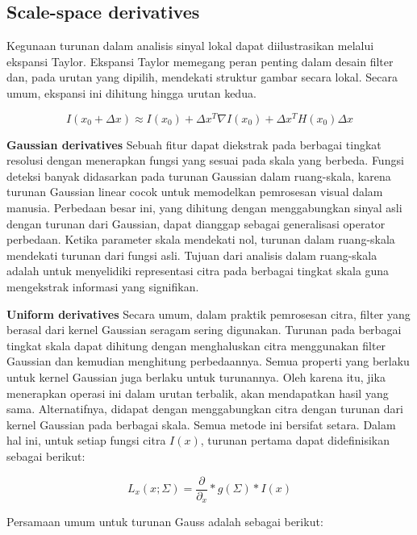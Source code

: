 \subsection{Scale-space derivatives}

Kegunaan turunan dalam analisis sinyal lokal dapat diilustrasikan melalui ekspansi Taylor. 
Ekspansi Taylor memegang peran penting dalam desain filter dan, pada urutan yang dipilih, mendekati struktur gambar secara lokal. 
Secara umum, ekspansi ini dihitung hingga urutan kedua.

\begin{equation*}
  I(x_{0} +\Delta x) \approx I(x_{0}) + \Delta x^{T}\nabla  I(x_{0}) + \Delta x^{T} H(x_{0}) \Delta x
\end{equation*}

\textbf{Gaussian derivatives} Sebuah fitur dapat diekstrak pada berbagai tingkat resolusi dengan menerapkan fungsi yang sesuai pada skala yang berbeda. 
Fungsi deteksi banyak didasarkan pada turunan Gaussian dalam ruang-skala, karena turunan Gaussian linear cocok untuk memodelkan pemrosesan visual dalam manusia. 
Perbedaan besar ini, yang dihitung dengan menggabungkan sinyal asli dengan turunan dari Gaussian, dapat dianggap sebagai generalisasi operator perbedaan. 
Ketika parameter skala mendekati nol, turunan dalam ruang-skala mendekati turunan dari fungsi asli. 
Tujuan dari analisis dalam ruang-skala adalah untuk menyelidiki representasi citra pada berbagai tingkat skala guna mengekstrak informasi yang signifikan.

\textbf{Uniform derivatives} Secara umum, dalam praktik pemrosesan citra, filter yang berasal dari kernel Gaussian seragam sering digunakan. 
Turunan pada berbagai tingkat skala dapat dihitung dengan menghaluskan citra menggunakan filter Gaussian dan kemudian menghitung perbedaannya. 
Semua properti yang berlaku untuk kernel Gaussian juga berlaku untuk turunannya. Oleh karena itu, jika menerapkan operasi ini dalam urutan terbalik, 
akan mendapatkan hasil yang sama. Alternatifnya, didapat dengan menggabungkan citra dengan turunan dari kernel Gaussian pada berbagai skala. 
Semua metode ini bersifat setara. Dalam hal ini, untuk setiap fungsi citra \(I(x)\), turunan pertama dapat didefinisikan sebagai berikut:

\begin{equation*}
  L_{x}(x;\Sigma) = \frac{\partial}{\partial_{x}} * g(\Sigma) * I(x)
\end{equation*}

Persamaan umum untuk turunan Gauss adalah sebagai berikut:

